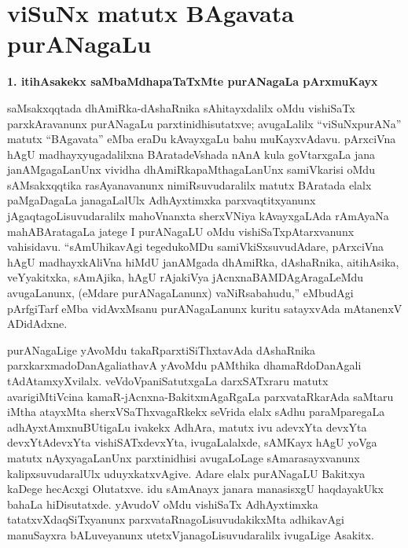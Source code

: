 \makeatletter
\def\@makechapterhead#1{%
  \vspace*{10\p@}%
{\fontsize{13pt}{13pt}\selectfont\raggedright{\bf  e. ke. bAyxnajiR}\par}
\vspace*{25\p@}%
  {\parindent \z@ \centering \normalfont
    \ifnum \c@secnumdepth >\m@ne
      \if@mainmatter
        {\huge\bfseries  #1}\par\nobreak
	\vskip 4pt
      \fi
    \fi
\smallskip 

 \vskip 10\p@  
{\fontsize{12pt}{12pt}\selectfont\raggedleft{anu: \bf pu.ti.na.}\par}
  }
\vskip 40\p@}
\makeatother

\chapter{viSuNx matutx BAgavata purANagaLu}\label{chap005}

\begin{center}
{\Large\bf 1. itihAsakekx saMbaMdhapaTaTxMte purANagaLa pArxmuKayx}
\end{center}

saMsakxqqtada dhAmiRka-dAshaRnika sAhitayxdalilx oMdu vishiSaTx parxkAravanunx purANa\-gaLu parxtinidhisutatxve; avugaLalilx ``viSuNxpurANa'' matutx ``BAgavata'' eMba eraDu kAvayx\-gaLu bahu muKayxvAdavu. pArxciVna hAgU madhayxyugadalilxna BAratadeVshada nAnA kula goVtarxgaLa jana janAMgagaLanUnx vividha dhAmiRkapaMthagaLanUnx samiVkarisi oMdu sAMsakxqqtika rasAyanavanunx nimiRsuvudaralilx matutx BAratada elalx paMgaDagaLa jana\-gaLalUlx AdhAyxtimxka parxvaqtitxyanunx jAgaqtagoLisuvudaralilx mahoVnanxta sherxVNiya kAvayx\-gaLAda rAmAyaNa mahABAratagaLa jatege I purANagaLU oMdu vishiSaTxpAtarxvanunx vahisidavu. ``sAmUhikavAgi tegedukoMDu samiVkiSxsuvudAdare, pArxciVna hAgU madhayxkAliVna hiMdU janAMgada dhAmiRka, dAshaRnika, aitihAsika, veYyakitxka, sAmAjika, hAgU rAjakiVya jAcnxnaBAMDAgAragaLeMdu avugaLanunx, (eMdare purANagaLanunx) vaNiRsabahudu,'' eMbudAgi pArfgiTarf eMba vidAvxMsanu purANagaLanunx kuritu satayxvAda mAtanenxV ADidAdxne.

purANagaLige yAvoMdu takaRparxtiSiThxtavAda dAshaRnika parxkarxmadoDanAgali\break athavA yAvoMdu pAMthika dhamaRdoDanAgali tAdAtamxyXvilalx. veVdoVpaniSatutx\-gaLa darxSATxraru matutx avarigiMtiVcina kamaR-jAcnxna-BakitxmAgaRgaLa parxvataRkarAda saMta\-ru iMtha atayxMta sherxVSaThxvagaRkekx seVrida elalx sAdhu paraMparegaLa adhAyxtAmxnuBUti\-gaLu ivakekx AdhAra, matutx ivu adevxYta devxYta devxYtAdevxYta vishiSATxdevxYta, ivugaLalalxde, sAMKayx hAgU yoVga matutx nAyxyagaLanUnx parxtinidhisi avugaLoLage sAmarasayxvanunx kalipxsuvudaralUlx uduyxkatxvAgive. Adare elalx purANagaLU Bakitxya kaDege hecAcxgi Olutatxve. idu sAmAnayx janara manasisxgU haqdayakUkx bahaLa hiDisutatxde. yAvudoV oMdu vishiSaTx AdhAyxtimxka tatatxvXdaqSiTxyanunx parxvataRnagoLisuvudakikxMta adhikavAgi manuSayxra bALuveyanunx utetxVjanagoLisuvudaralilx ivugaLige Asakitx.

